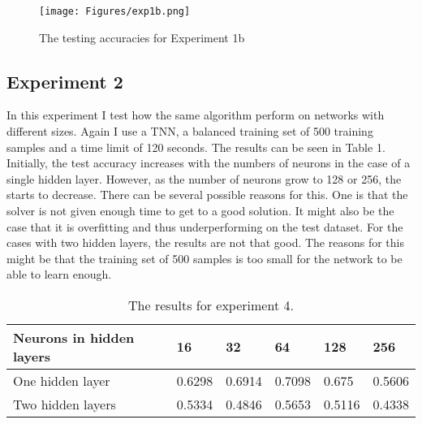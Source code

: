 \begin{figure}[H]
    \centering
    \texttt{[image: Figures/exp1b.png]}
    \caption{The testing accuracies for Experiment 1b}
    \label{Figure 3}
\end{figure}



\subsection{Experiment 2}
In this experiment I test how the same algorithm perform on networks with different sizes. Again I use a TNN, a balanced training set of 500 training samples and a time limit of 120 seconds. The results can be seen in Table 1. Initially, the test accuracy increases with the numbers of neurons in the case of a single hidden layer. However, as the number of neurons grow to 128 or 256, the starts to decrease. There can be several possible reasons for this. One is that the solver is not given enough time to get to a good solution. It might also be the case that it is overfitting and thus underperforming on the test dataset. For the cases with two hidden layers, the results are not that good. The reasons for this might be that the training set of 500 samples is too small for the network to be able to learn enough. 


\begin{table}[H]
    \centering
    \begin{tabular}{|l|l|l|l|l|l|}
    \hline
    Neurons in hidden layers & 16     & 32     & 64     & 128    & 256    \\ \hline
    One hidden layer         & 0.6298 & 0.6914 & 0.7098 & 0.675  & 0.5606 \\ \hline
    Two hidden layers        & 0.5334 & 0.4846 & 0.5653 & 0.5116 & 0.4338 \\ \hline
    \end{tabular}
    \caption{The results for experiment 4. }
    \label{Table 1}
\end{table}


